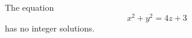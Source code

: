 \begin{proposition}
    The equation
\[
    x^2+y^2=4z+3
\]
    has no integer solutions.
\end{proposition}
